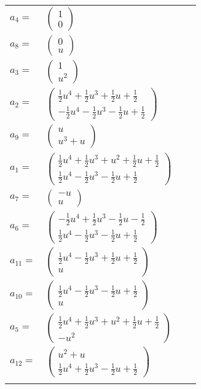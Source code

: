 \documentclass[1p]{elsarticle_modified}
\theoremstyle{definition}
\begin{document}
\begin{tabular}{m{7pt} m{180pt} m{7pt} m{180pt} }
\flushright $a_{4}=$&$\begin{pmatrix}1\\0\end{pmatrix}$ \\
\flushright $a_{8}=$&$\begin{pmatrix}0\\u\end{pmatrix}$ \\
\flushright $a_{3}=$&$\begin{pmatrix}1\\u^2\end{pmatrix}$ \\
\flushright $a_{2}=$&$\begin{pmatrix}\frac{1}{2} u^4+\frac{1}{2} u^3+\frac{1}{2} u+\frac{1}{2}\\-\frac{1}{2} u^4-\frac{1}{2} u^3-\frac{1}{2} u+\frac{1}{2}\end{pmatrix}$ \\
\flushright $a_{9}=$&$\begin{pmatrix}u\\u^3+u\end{pmatrix}$ \\
\flushright $a_{1}=$&$\begin{pmatrix}\frac{1}{2} u^4+\frac{1}{2} u^3+u^2+\frac{1}{2} u+\frac{1}{2}\\\frac{1}{2} u^4-\frac{1}{2} u^3-\frac{1}{2} u+\frac{1}{2}\end{pmatrix}$ \\
\flushright $a_{7}=$&$\begin{pmatrix}- u\\u\end{pmatrix}$ \\
\flushright $a_{6}=$&$\begin{pmatrix}-\frac{1}{2} u^4+\frac{1}{2} u^3-\frac{1}{2} u-\frac{1}{2}\\\frac{1}{2} u^4-\frac{1}{2} u^3-\frac{1}{2} u+\frac{1}{2}\end{pmatrix}$ \\
\flushright $a_{11}=$&$\begin{pmatrix}\frac{1}{2} u^4-\frac{1}{2} u^3+\frac{1}{2} u+\frac{1}{2}\\u\end{pmatrix}$ \\
\flushright $a_{10}=$&$\begin{pmatrix}\frac{1}{2} u^4-\frac{1}{2} u^3-\frac{1}{2} u+\frac{1}{2}\\u\end{pmatrix}$ \\
\flushright $a_{5}=$&$\begin{pmatrix}\frac{1}{2} u^4+\frac{1}{2} u^3+u^2+\frac{1}{2} u+\frac{1}{2}\\- u^2\end{pmatrix}$ \\
\flushright $a_{12}=$&$\begin{pmatrix}u^2+u\\\frac{1}{2} u^4+\frac{1}{2} u^3-\frac{1}{2} u+\frac{1}{2}\end{pmatrix}$\\&\end{tabular}
\end{document}
